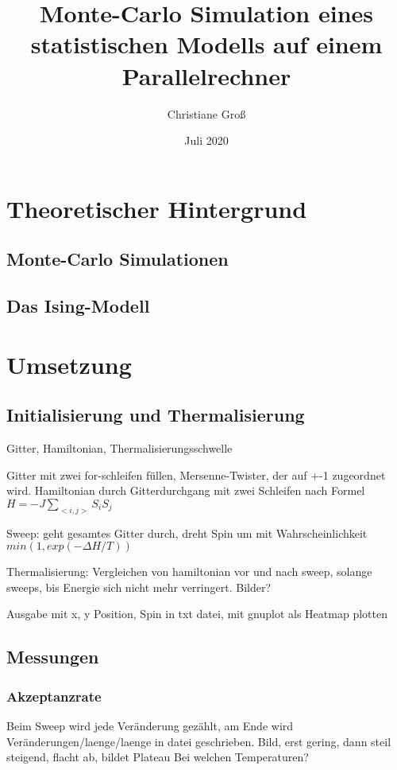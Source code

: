 \documentclass{scrreprt}
\title{Monte-Carlo Simulation eines statistischen Modells auf einem Parallelrechner}
\date{Juli 2020}
\author{Christiane Groß}
\begin{document}
	\maketitle
	
	
	\tableofcontents
	
	\clearpage
	
	\chapter{Theoretischer Hintergrund}
	\section{Monte-Carlo Simulationen}
	\section{Das Ising-Modell}
	\chapter{Umsetzung}
	\section{Initialisierung und Thermalisierung}
	Gitter, Hamiltonian, Thermalisierungsschwelle
	
	Gitter mit zwei for-schleifen füllen, Mersenne-Twister, der auf +-1 zugeordnet wird.
	Hamiltonian durch Gitterdurchgang mit zwei Schleifen nach Formel $H=-J\sum_{<i,j>}S_iS_j$
	
	Sweep: geht gesamtes Gitter durch, dreht Spin um mit Wahrscheinlichkeit $min\left(1, exp(-\Delta H/T)\right) $
	
	Thermalisierung: 
	Vergleichen von hamiltonian vor und nach sweep, solange sweeps, bis Energie sich nicht mehr verringert. Bilder?
	
	Ausgabe mit x, y Position, Spin in txt datei, mit gnuplot als Heatmap plotten
	\section{Messungen}
	\subsection{Akzeptanzrate}
	Beim Sweep wird jede Veränderung gezählt, am Ende wird Veränderungen/laenge/laenge in datei geschrieben. Bild, erst gering, dann steil steigend, flacht ab, bildet Plateau
	Bei welchen Temperaturen?
\end{document}
